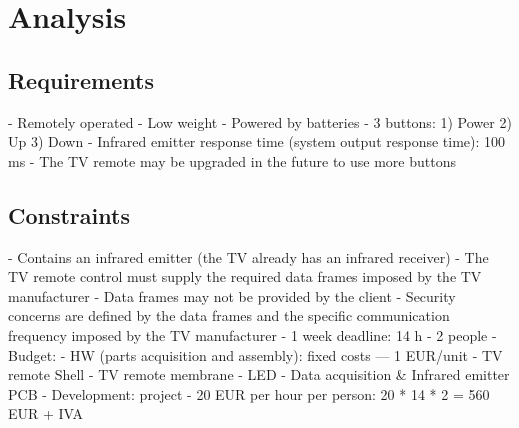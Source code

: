 \chapter{Analysis}
\label{ch:analysis}

\section{Requirements}
\label{sec:requirements}
- Remotely operated
- Low weight
- Powered by batteries
- 3 buttons:
  1) Power
  2) Up
  3) Down
- Infrared emitter response time (system output response time): 100 ms
- The TV remote may be upgraded in the future to use more buttons

\section{Constraints}
\label{sec:constraints}
- Contains an infrared emitter (the TV already has an infrared receiver)
- The TV remote control must supply the required data frames imposed by the TV
  manufacturer
- Data frames may not be provided by the client
- Security concerns are defined by the data frames and the specific
  communication frequency imposed by the TV manufacturer
- 1 week deadline: 14 h
- 2 people
- Budget:
  - HW (parts acquisition and assembly): fixed costs --- 1 EUR/unit
    - TV remote Shell
    - TV remote membrane
    - LED
    - Data acquisition \& Infrared emitter PCB
  - Development: project
    - 20 EUR per hour per person: 20 * 14 * 2 = 560 EUR + IVA